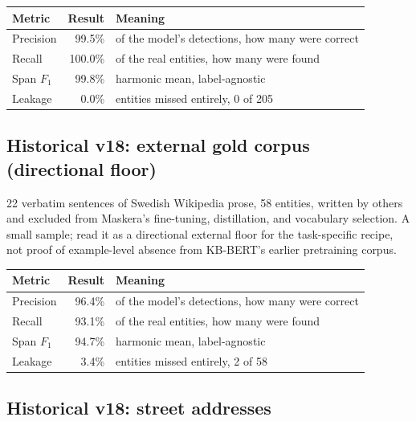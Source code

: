 \documentclass[10pt,a4paper]{article}
\begin{document}
\begin{table}[H]
\centering
\begin{tabular}{lrl}
\toprule
Metric & Result & Meaning \\
\midrule
Precision & 99.5\% & of the model's detections, how many were correct \\
Recall & 100.0\% & of the real entities, how many were found \\
Span $F_1$ & 99.8\% & harmonic mean, label-agnostic \\
Leakage & 0.0\% & entities missed entirely, 0 of 205 \\
\bottomrule
\end{tabular}
\end{table}

\subsection{Historical v18: external gold corpus (directional floor)}

22 verbatim sentences of Swedish Wikipedia prose, 58 entities, written by
others and excluded from Maskera's fine-tuning, distillation, and vocabulary
selection. A small sample; read it as a directional external floor for the
task-specific recipe, not proof of example-level absence from KB-BERT's
earlier pretraining corpus.

\begin{table}[H]
\centering
\begin{tabular}{lrl}
\toprule
Metric & Result & Meaning \\
\midrule
Precision & 96.4\% & of the model's detections, how many were correct \\
Recall & 93.1\% & of the real entities, how many were found \\
Span $F_1$ & 94.7\% & harmonic mean, label-agnostic \\
Leakage & 3.4\% & entities missed entirely, 2 of 58 \\
\bottomrule
\end{tabular}
\end{table}

\subsection{Historical v18: street addresses}
\end{document}

